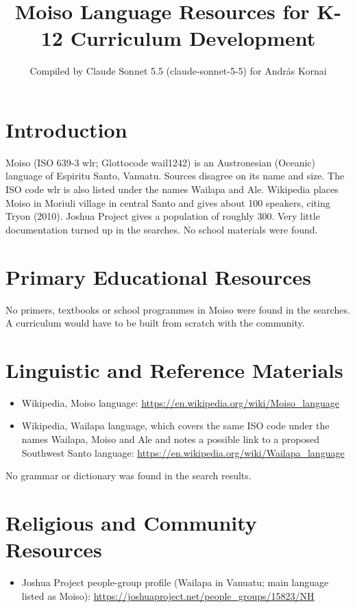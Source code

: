 \documentclass[12pt]{article}
\title{Moiso Language Resources for K-12 Curriculum Development}
\author{Compiled by Claude Sonnet 5.5 (claude-sonnet-5-5) for Andr\'as Kornai}
\date{}
\begin{document}
\maketitle

\section{Introduction}
Moiso (ISO 639-3 wlr; Glottocode wail1242) is an Austronesian (Oceanic) language of Espiritu Santo, Vanuatu. Sources disagree on its name and size. The ISO code wlr is also listed under the names Wailapa and Ale. Wikipedia places Moiso in Moriuli village in central Santo and gives about 100 speakers, citing Tryon (2010). Joshua Project gives a population of roughly 300. Very little documentation turned up in the searches. No school materials were found.

\section{Primary Educational Resources}
No primers, textbooks or school programmes in Moiso were found in the searches. A curriculum would have to be built from scratch with the community.

\section{Linguistic and Reference Materials}
\begin{itemize}
\item Wikipedia, Moiso language: \url{https://en.wikipedia.org/wiki/Moiso_language}
\item Wikipedia, Wailapa language, which covers the same ISO code under the names Wailapa, Moiso and Ale and notes a possible link to a proposed Southwest Santo language: \url{https://en.wikipedia.org/wiki/Wailapa_language}
\end{itemize}
No grammar or dictionary was found in the search results.

\section{Religious and Community Resources}
\begin{itemize}
\item Joshua Project people-group profile (Wailapa in Vanuatu; main language listed as Moiso): \url{https://joshuaproject.net/people_groups/15823/NH}
\end{itemize}
\end{document}
